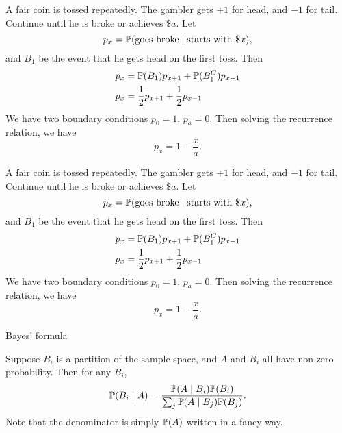 \begin{note}
  \begin{field}
    \begin{eg}
      A fair coin is tossed repeatedly. The gambler gets $+1$ for head, and $-1$ for tail. Continue until he is broke or achieves $\$a$. Let
      \[
        p_x = \P(\text{goes broke}\mid \text{starts with \$}x),
      \]
      and $B_1$ be the event that he gets head on the first toss. Then
      \begin{align*}
        p_x &= \P(B_1)p_{x + 1} + \P(B_1^C) p_{x - 1}\\
        p_x &= \frac{1}{2}p_{x + 1} + \frac{1}{2}p_{x - 1}
      \end{align*}
      We have two boundary conditions $p_0 = 1$, $p_a = 0$. Then solving the recurrence relation, we have
      \[
        p_x = 1 - \frac{x}{a}.
      \]
    \end{eg}
  \end{field}
  \begin{field}
    \begin{eg}
      A fair coin is tossed repeatedly. The gambler gets $+1$ for head, and $-1$ for tail. Continue until he is broke or achieves $\$a$. Let
      \[
        p_x = \P(\text{goes broke}\mid \text{starts with \$}x),
      \]
      and $B_1$ be the event that he gets head on the first toss. Then
      \begin{align*}
        p_x &= \P(B_1)p_{x + 1} + \P(B_1^C) p_{x - 1}\\
        p_x &= \frac{1}{2}p_{x + 1} + \frac{1}{2}p_{x - 1}
      \end{align*}
      We have two boundary conditions $p_0 = 1$, $p_a = 0$. Then solving the recurrence relation, we have
      \[
        p_x = 1 - \frac{x}{a}.
      \]
    \end{eg}
  \end{field}
  \xplain{}%
\end{note}

%
\begin{note}
  \begin{field}
    Bayes' formula
  \end{field}
  \begin{field}
    \begin{thm}
      Suppose $B_i$ is a partition of the sample space, and $A$ and $B_i$ all have non-zero probability. Then for any $B_i$,
      \[
        \P(B_i \mid A) = \frac{\P(A \mid B_i)\P(B_i)}{\sum_j\P(A \mid B_j)\P(B_j)}.
      \]
      Note that the denominator is simply $\P(A)$ written in a fancy way.
    \end{thm}
  \end{field}
  \xplain{}%
\end{note}

